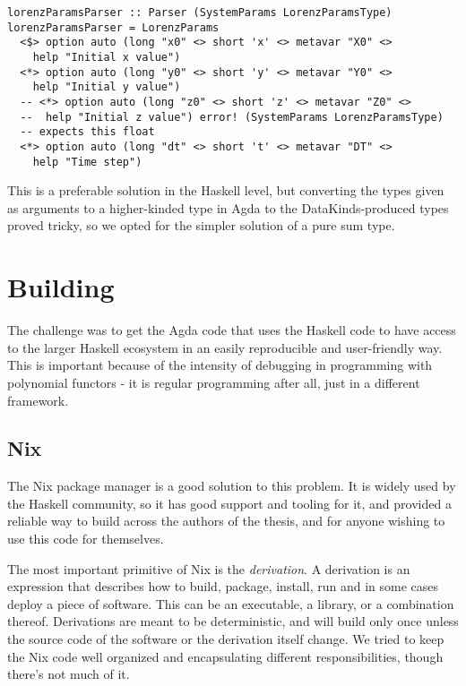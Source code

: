 \begin{verbatim}
lorenzParamsParser :: Parser (SystemParams LorenzParamsType)
lorenzParamsParser = LorenzParams
  <$> option auto (long "x0" <> short 'x' <> metavar "X0" <> 
    help "Initial x value")
  <*> option auto (long "y0" <> short 'y' <> metavar "Y0" <> 
    help "Initial y value")
  -- <*> option auto (long "z0" <> short 'z' <> metavar "Z0" <> 
  --  help "Initial z value") error! (SystemParams LorenzParamsType)
  -- expects this float
  <*> option auto (long "dt" <> short 't' <> metavar "DT" <> 
    help "Time step")
\end{verbatim}

This is a preferable solution in the Haskell level, but converting the types given as arguments to a higher-kinded type in Agda to the DataKinds-produced types proved tricky, so we opted for the simpler solution of a pure sum type.

\section{Building}

The challenge was to get the Agda code that uses the Haskell code to have access to the larger Haskell ecosystem in an easily reproducible and user-friendly way. This is important because of the intensity of debugging in programming with polynomial functors - it is regular programming after all, just in a different framework.

\subsection{Nix}

The Nix\cite{nix} package manager is a good solution to this problem. It is widely used by the Haskell community, so it has good support and tooling for it, and provided a reliable way to build across the authors of the thesis, and for anyone wishing to use this code for themselves.

The most important primitive of Nix is the \textit{derivation}. A derivation is an expression that describes how to build, package, install, run and in some cases deploy a piece of software. This can be an executable, a library, or a combination thereof. Derivations are meant to be deterministic, and will build only once unless the source code of the software or the derivation itself change. We tried to keep the Nix code well organized and encapsulating different responsibilities, though there's not much of it.

